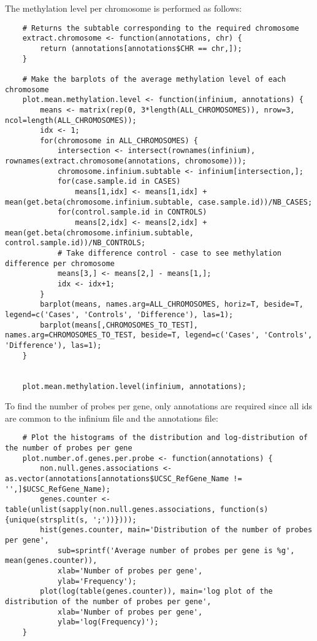\documentclass{article}
\begin{document}
The methylation level per chromosome is performed as follows:
\begin{lstlisting}
	# Returns the subtable corresponding to the required chromosome
	extract.chromosome <- function(annotations, chr) {
		return (annotations[annotations$CHR == chr,]);
	}

	# Make the barplots of the average methylation level of each chromosome
	plot.mean.methylation.level <- function(infinium, annotations) {
		means <- matrix(rep(0, 3*length(ALL_CHROMOSOMES)), nrow=3, ncol=length(ALL_CHROMOSOMES));
		idx <- 1;
		for(chromosome in ALL_CHROMOSOMES) {
			intersection <- intersect(rownames(infinium), rownames(extract.chromosome(annotations, chromosome)));
			chromosome.infinium.subtable <- infinium[intersection,];
			for(case.sample.id in CASES)
				means[1,idx] <- means[1,idx] + mean(get.beta(chromosome.infinium.subtable, case.sample.id))/NB_CASES;
			for(control.sample.id in CONTROLS)
				means[2,idx] <- means[2,idx] + mean(get.beta(chromosome.infinium.subtable, control.sample.id))/NB_CONTROLS;
			# Take difference control - case to see methylation difference per chromosome
			means[3,] <- means[2,] - means[1,];
			idx <- idx+1;
		}
		barplot(means, names.arg=ALL_CHROMOSOMES, horiz=T, beside=T, legend=c('Cases', 'Controls', 'Difference'), las=1);
		barplot(means[,CHROMOSOMES_TO_TEST], names.arg=CHROMOSOMES_TO_TEST, beside=T, legend=c('Cases', 'Controls', 'Difference'), las=1);
	}


	plot.mean.methylation.level(infinium, annotations);
\end{lstlisting}

To find the number of probes per gene, only annotations are required since all ids are common to the infinium file and the annotations file:
\begin{lstlisting}
	# Plot the histograms of the distribution and log-distribution of the number of probes per gene
	plot.number.of.genes.per.probe <- function(annotations) {
		non.null.genes.associations <- as.vector(annotations[annotations$UCSC_RefGene_Name != '',]$UCSC_RefGene_Name);
		genes.counter <- table(unlist(sapply(non.null.genes.associations, function(s) {unique(strsplit(s, ';'))})));
		hist(genes.counter, main='Distribution of the number of probes per gene',
			sub=sprintf('Average number of probes per gene is %g', mean(genes.counter)),
			xlab='Number of probes per gene',
			ylab='Frequency');
		plot(log(table(genes.counter)), main='log plot of the distribution of the number of probes per gene',
			xlab='Number of probes per gene',
			ylab='log(Frequency)');
	}
\end{lstlisting}
\end{document}
